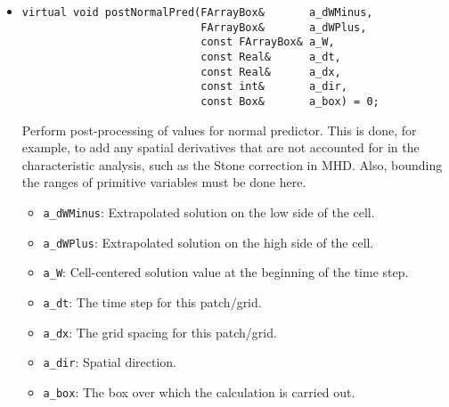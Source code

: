 \begin{itemize}
\item \begin{small}\begin{verbatim}
virtual void postNormalPred(FArrayBox&       a_dWMinus,
                            FArrayBox&       a_dWPlus,
                            const FArrayBox& a_W,
                            const Real&      a_dt,
                            const Real&      a_dx,
                            const int&       a_dir,
                            const Box&       a_box) = 0;
\end{verbatim}\end{small}
Perform post-processing of values for normal predictor.  This is done,
for example, to add any spatial derivatives that are not accounted for
in the characteristic analysis, such as the Stone correction in MHD.
Also, bounding the ranges of primitive variables must be done here. 
\begin{itemize}
\item \verb/a_dWMinus/:  Extrapolated solution on the low side of the cell.
\vspace{-0.07in}
\item \verb/a_dWPlus/:  Extrapolated solution on the high side of the cell.
\vspace{-0.07in}
\item \verb/a_W/:  Cell-centered solution value at the beginning of the 
time step.
\vspace{-0.07in}
\item \verb/a_dt/:  The time step for this patch/grid.
\vspace{-0.07in}
\item \verb/a_dx/: The grid spacing for this patch/grid.
\vspace{-0.07in}
\item \verb/a_dir/: Spatial direction.
\vspace{-0.07in}
\item \verb/a_box/:  The box over which the calculation is carried out.
\end{itemize}


\end{itemize}
